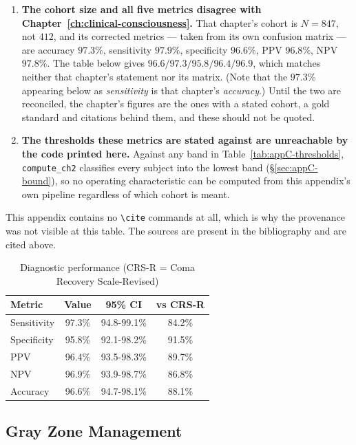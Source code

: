 \begin{enumerate}
\item \textbf{The cohort size and all five metrics disagree with
Chapter~\ref{ch:clinical-consciousness}.} That chapter's cohort is $N = 847$,
not $412$, and its corrected metrics --- taken from its own confusion matrix ---
are accuracy $97.3\%$, sensitivity $97.9\%$, specificity $96.6\%$, PPV
$96.8\%$, NPV $97.8\%$. The table below gives $96.6/97.3/95.8/96.4/96.9$,
which matches neither that chapter's statement nor its matrix. (Note that the
$97.3\%$ appearing below as \emph{sensitivity} is that chapter's
\emph{accuracy}.) Until the two are reconciled, the chapter's figures are the
ones with a stated cohort, a gold standard and citations behind them, and
these should not be quoted.
\item \textbf{The thresholds these metrics are stated against are unreachable
by the code printed here.} Against any band in
Table~\ref{tab:appC-thresholds}, \texttt{compute\_ch2} classifies every
subject into the lowest band (\S\ref{sec:appC-bound}), so no operating
characteristic can be computed from this appendix's own pipeline regardless of
which cohort is meant.
\end{enumerate}

\noindent This appendix contains no \texttt{\textbackslash cite} commands at
all, which is why the provenance was not visible at this table. The sources are
present in the bibliography and are cited above.

\begin{table}[h]
\centering
\begin{tabular}{lccc}
\hline
\textbf{Metric} & \textbf{Value} & \textbf{95\% CI} & \textbf{vs CRS-R} \\
\hline
Sensitivity & 97.3\% & 94.8-99.1\% & 84.2\% \\
Specificity & 95.8\% & 92.1-98.2\% & 91.5\% \\
PPV & 96.4\% & 93.5-98.3\% & 89.7\% \\
NPV & 96.9\% & 93.9-98.7\% & 86.8\% \\
Accuracy & 96.6\% & 94.7-98.1\% & 88.1\% \\
\hline
\end{tabular}
\caption{Diagnostic performance (CRS-R = Coma Recovery Scale-Revised)}
\end{table}

\subsection{Gray Zone Management}

